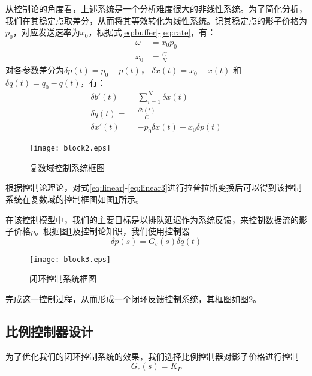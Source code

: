 从控制论的角度看，上述系统是一个分析难度很大的非线性系统。为了简化分析，我们在其稳定点取差分，从而将其等效转化为线性系统。记其稳定点的影子价格为$p_0$，对应发送速率为$x_0$，根据式\ref{eq:buffer}-\ref{eq:rate}，有：
\begin{eqnarray}
    \omega &= x_0 p_0\\
    x_0 &= \frac{C}{N}
\end{eqnarray}
对各参数差分为$\delta p(t)=p_0 - p(t)$， $\delta x(t) = x_0 - x(t)$ 和 $\delta q(t) =q_0 - q(t)$，有：
\begin{eqnarray}\label{eq:linear}
    \delta b'(t) =& \sum_{i=1}^{N}{\delta x(t)}  \\
    \delta q(t)  =& \frac{\delta b(t)}{C} \\
    \delta x'(t) =& -p_0\delta x(t) - x_0 \delta p(t)\label{eq:linear3}
\end{eqnarray}

\begin{figure}[htbp]
  \centering
  \texttt{[image: block2.eps]}
  \caption{复数域控制系统框图}
  \label{fig:block2}
\end{figure}

根据控制论理论，对式\ref{eq:linear}-\ref{eq:linear3}进行拉普拉斯变换后可以得到该控制系统在复数域的控制框图如图\ref{fig:block2}所示。

在该控制模型中，我们的主要目标是以排队延迟作为系统反馈，来控制数据流的影子价格$p$。根据图\ref{fig:block2}及控制论知识，我们使用控制器
\begin{equation}
\delta p(s) = G_c(s)\delta q(t)
\label{equ_x_dif}
\end{equation}

\begin{figure}[htbp]
  \centering
  \texttt{[image: block3.eps]}
  \caption{闭环控制系统框图}
  \label{fig:block3}
\end{figure}

完成这一控制过程，从而形成一个闭环反馈控制系统，其框图如图\ref{fig:block3}。

    \subsection{比例控制器设计}
    为了优化我们的闭环控制系统的效果，我们选择比例控制器对影子价格进行控制
    \begin{equation}\label{eq:gcs}
        G_c(s) = K_P
    \end{equation}

